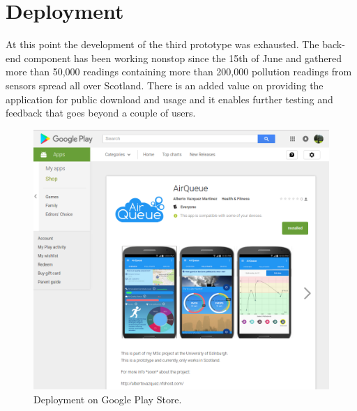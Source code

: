 \section{Deployment}
At this point the development of the third prototype was exhausted. The back-end component has been working nonstop since the 15th of June and gathered more than 50,000 readings containing more than 200,000 pollution readings from sensors spread all over Scotland. There is an added value on providing the application for public download and usage and it enables further testing and feedback that goes beyond a couple of users.

\begin{figure}[H]
\begin{adjustbox}{width=.8\textwidth,center=\textwidth}
  \centering
  \includegraphics[scale=1]{images/play_store.png}
\end{adjustbox}
  \caption[Deployment on Google Play Store]{Deployment on Google Play Store.\footnotemark}
  \label{fig:deployment_play_store}
\end{figure}

